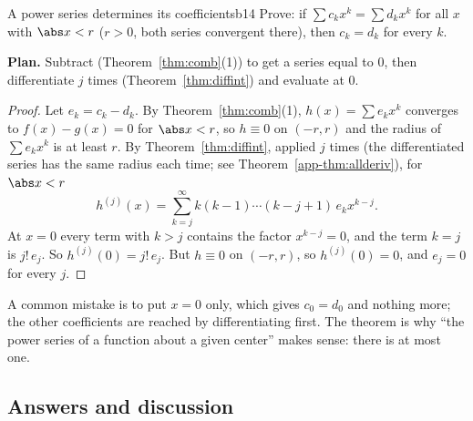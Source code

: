 \documentclass[11pt]{article}
\begin{document}
\begin{exmp}{A power series determines its coefficients}{b14}
Prove: if $\sum c_kx^k=\sum d_kx^k$ for all $x$ with $\abs x<r$ ($r>0$, both series convergent there), then $c_k=d_k$ for every $k$.

\textbf{Plan.} Subtract (Theorem~\ref{thm:comb}(1)) to get a series equal to $0$, then differentiate $j$ times (Theorem~\ref{thm:diffint}) and evaluate at $0$.

\begin{proof}
Let $e_k=c_k-d_k$. By Theorem~\ref{thm:comb}(1), $h(x)=\sum e_kx^k$ converges to $f(x)-g(x)=0$ for $\abs x<r$, so $h\equiv0$ on $(-r,r)$ and the radius of $\sum e_kx^k$ is at least $r$. By Theorem~\ref{thm:diffint}, applied $j$ times (the differentiated series has the same radius each time; see Theorem~\ref{app-thm:allderiv}), for $\abs x<r$
\[
h^{(j)}(x)=\sum_{k=j}^\infty k(k-1)\cdots(k-j+1)\,e_kx^{k-j}.
\]
At $x=0$ every term with $k>j$ contains the factor $x^{k-j}=0$, and the term $k=j$ is $j!\,e_j$. So $h^{(j)}(0)=j!\,e_j$. But $h\equiv0$ on $(-r,r)$, so $h^{(j)}(0)=0$, and $e_j=0$ for every $j$.
\end{proof}
A common mistake is to put $x=0$ only, which gives $c_0=d_0$ and nothing more; the other coefficients are reached by differentiating first. The theorem is why ``the power series of a function about a given center'' makes sense: there is at most one.
\end{exmp}

\subsection*{Answers and discussion}
\end{document}
